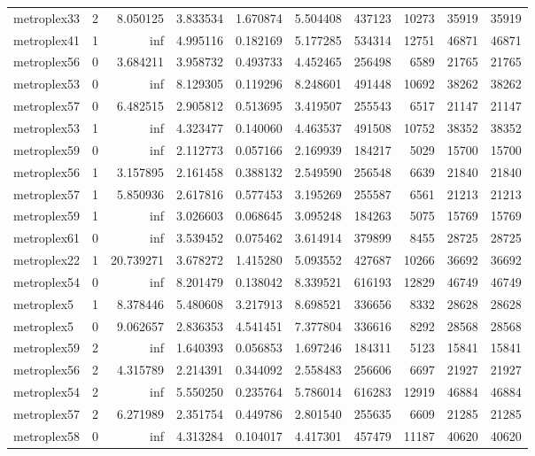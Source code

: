 \begin{longtable}{|l|r|r|r|r|r|r|r|r|r|}
metroplex33 & 2 & 8.050125 & 3.833534 & 1.670874 & 5.504408 & 437123 & 10273 & 35919 & 35919 \\
metroplex41 & 1 & inf & 4.995116 & 0.182169 & 5.177285 & 534314 & 12751 & 46871 & 46871 \\
metroplex56 & 0 & 3.684211 & 3.958732 & 0.493733 & 4.452465 & 256498 & 6589 & 21765 & 21765 \\
metroplex53 & 0 & inf & 8.129305 & 0.119296 & 8.248601 & 491448 & 10692 & 38262 & 38262 \\
metroplex57 & 0 & 6.482515 & 2.905812 & 0.513695 & 3.419507 & 255543 & 6517 & 21147 & 21147 \\
metroplex53 & 1 & inf & 4.323477 & 0.140060 & 4.463537 & 491508 & 10752 & 38352 & 38352 \\
metroplex59 & 0 & inf & 2.112773 & 0.057166 & 2.169939 & 184217 & 5029 & 15700 & 15700 \\
metroplex56 & 1 & 3.157895 & 2.161458 & 0.388132 & 2.549590 & 256548 & 6639 & 21840 & 21840 \\
metroplex57 & 1 & 5.850936 & 2.617816 & 0.577453 & 3.195269 & 255587 & 6561 & 21213 & 21213 \\
metroplex59 & 1 & inf & 3.026603 & 0.068645 & 3.095248 & 184263 & 5075 & 15769 & 15769 \\
metroplex61 & 0 & inf & 3.539452 & 0.075462 & 3.614914 & 379899 & 8455 & 28725 & 28725 \\
metroplex22 & 1 & 20.739271 & 3.678272 & 1.415280 & 5.093552 & 427687 & 10266 & 36692 & 36692 \\
metroplex54 & 0 & inf & 8.201479 & 0.138042 & 8.339521 & 616193 & 12829 & 46749 & 46749 \\
metroplex5 & 1 & 8.378446 & 5.480608 & 3.217913 & 8.698521 & 336656 & 8332 & 28628 & 28628 \\
metroplex5 & 0 & 9.062657 & 2.836353 & 4.541451 & 7.377804 & 336616 & 8292 & 28568 & 28568 \\
metroplex59 & 2 & inf & 1.640393 & 0.056853 & 1.697246 & 184311 & 5123 & 15841 & 15841 \\
metroplex56 & 2 & 4.315789 & 2.214391 & 0.344092 & 2.558483 & 256606 & 6697 & 21927 & 21927 \\
metroplex54 & 2 & inf & 5.550250 & 0.235764 & 5.786014 & 616283 & 12919 & 46884 & 46884 \\
metroplex57 & 2 & 6.271989 & 2.351754 & 0.449786 & 2.801540 & 255635 & 6609 & 21285 & 21285 \\
metroplex58 & 0 & inf & 4.313284 & 0.104017 & 4.417301 & 457479 & 11187 & 40620 & 40620 \\

\end{longtable}
